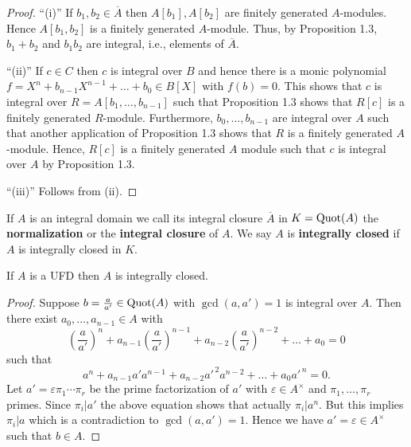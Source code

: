 \begin{proof}[Proof]
\enquote{(i)} If $b_1, b_2 \in \overline{A}$ then $A[b_1], A[b_2]$ are finitely generated $A$-modules. Hence $A[b_1,b_2]$ is a finitely generated $A$-module.
Thus, by Proposition 1.3, $b_1+b_2$ and $b_1b_2$ are integral, i.e., elements of $\overline{A}$.

\bigskip \enquote{(ii)} If $c\in C$ then $c$ is integral over $B$ and hence there is a monic polynomial $f= X^n + b_{n-1}X^{n-1} + \dots + b_0 \in B[X]$ with $f(b)=0$. This shows that $c$ is integral over $R=A[b_1,\dots,b_{n-1}]$ such that Proposition 1.3 shows that $R[c]$ is a finitely generated $R$-module.
Furthermore, $b_0,\dots, b_{n-1}$ are integral over $A$ such that another application of Proposition 1.3 shows that $R$ is a finitely generated $A$-module.
Hence, $R[c]$ is a finitely generated $A$ module such that $c$ is integral over $A$ by Proposition 1.3.

\bigskip \enquote{(iii)} Follows from (ii).
\end{proof}

\begin{definition}
If $A$ is an integral domain we call its integral closure $\overline{A}$ in $K = \operatorname{Quot}(A)$ the \textbf{normalization} or the \textbf{integral closure} of $A$. We say $A$ is \textbf{integrally closed} if $A$ is integrally closed in $K$.
\end{definition}


\begin{remark}
	If $A$ is a UFD then $A$ is integrally closed.
\end{remark}

\begin{proof}
Suppose $b = \frac{a}{a'} \in \operatorname{Quot}(A)$ with $\gcd(a,a') =1$ is integral over $A$.
Then there exist $a_0, \dots, a_{n-1} \in A$ with
\[ \left( \frac{a}{a'} \right)^n + a_{n-1} \left(\frac{a}{a'} \right)^{n-1}
+ a_{n-2} \left(\frac{a}{a'} \right)^{n-2} + \dots + a_0 = 0
\]
such that
\[ a^n+a_{n-1}a'a^{n-1} + a_{n-2}a'^{\, 2} a^{n-2} + \dots + a_0 a'^{\, n} = 0.
\]
Let $a' = \varepsilon \pi_1 \cdots \pi_r$ be the prime factorization of $a'$ with $\varepsilon \in A^\times$ and $\pi_1, \dots, \pi_r$ primes.
Since $\pi_i | a'$ the above equation shows that actually $\pi_i | a^n$. But this implies $\pi_i | a$ which is a contradiction to $\gcd(a,a') = 1$.
Hence we have $a' = \varepsilon \in A^\times$ such that $b \in A$.
\end{proof}



